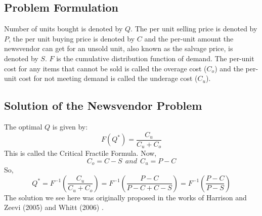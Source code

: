 \subsection{Problem Formulation} Number of units bought is denoted by $Q$. The per unit selling price is denoted by $P$, the per unit buying price is denoted by $C$ and the per-unit amount the newsvendor can get for an unsold unit, also known as the salvage price, is denoted by $S$. $F$ is the cumulative distribution function of demand. The per-unit cost for any items that cannot be sold is called the overage cost ($C_o$) and the per-unit cost for not meeting demand is called the  underage cost ($C_u$). \\
\subsection{Solution of the Newsvendor Problem}
The optimal $Q$ is given by:
\[F(Q^*)=\frac{C_u}{C_u+C_o}\]
This is called the Critical Fractile Formula. Now,
\[C_o = C-S \ \ and \ \ C_u = P-C \]
So,
\[Q^*=F^{-1}(\frac{C_u}{C_u+C_o}) 
=F^{-1}(\frac{P-C}{P-C+C-S})
=F^{-1}(\frac{P-C}{P-S})\]
The solution we see here was originally proposed in the works of Harrison and Zeevi (2005) \cite{newsvendor} and Whitt (2006) \cite{whitt}.

